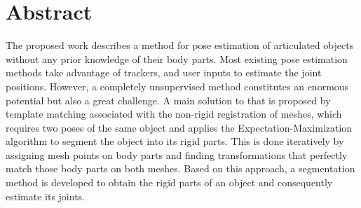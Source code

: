 \chapter{Abstract}


The proposed work describes a method for pose estimation of articulated objects without any prior knowledge of their body parts. Most existing pose estimation methods take advantage of trackers, and user inputs to estimate the joint positions. However, a completely unsupervised method constitutes an enormous potential but also a great challenge. A main solution to that is proposed by template matching associated with the non-rigid registration of meshes, which requires two poses of the same object and applies the Expectation-Maximization algorithm to segment the object into its rigid parts. This is done iteratively by assigning mesh points on body parts and finding transformations that perfectly match those body parts on both meshes. Based on this approach, a segmentation method is developed to obtain the rigid parts of an object and consequently estimate its joints.

